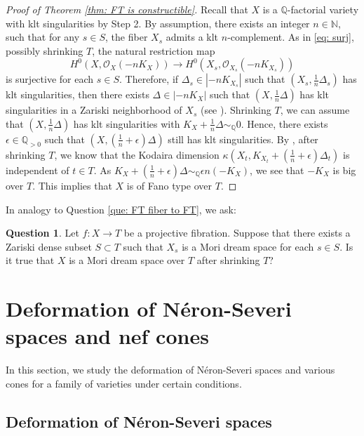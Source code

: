 \documentclass[11pt,oneside,reqno]{amsart}
\numberwithin{equation}{section}
\theoremstyle{definition}
\newtheorem{question}[proposition]{Question}
\newcommand{\bN}{\mathbb{N}}
\newcommand{\bQ}{\mathbb{Q}}
\newcommand{\mO}{\mathcal{O}}
\begin{document}
\begin{proof}[Proof of Theorem \ref{thm: FT is constructible}]
Recall that $X$ is a $\bQ$-factorial variety with klt singularities by Step 2. By assumption, there exists an integer $n\in \bN$, such that for any $s\in S$, the fiber $X_s$ admits a klt $n$-complement. As in \eqref{eq: surj}, possibly shrinking $T$, the natural restriction map
\[
H^0(X, \mO_{X}(-nK_X)) \to H^0(X_s, \mO_{X_s}(-nK_{X_s}))
\] is surjective for each $s\in S$. Therefore, if $\Delta_s\in  |-nK_{X_s}|$ such that $(X_s, \frac 1 n \Delta_s)$ has klt singularities, then there exists $\Delta\in |-nK_X|$ such that $(X, \frac 1 n \Delta)$ has klt singularities in a Zariski neighborhood of $X_s$ (see \cite[Theorem 9.5.19]{Laz04b}). Shrinking $T$, we can assume that $(X, \frac 1 n \Delta)$ has klt singularities with $K_X+\frac 1 n \Delta\sim_\bQ 0$. Hence, there exists $\epsilon \in \bQ_{>0}$ such that $(X, (\frac 1 n +\epsilon)\Delta)$ still has klt singularities. By \cite[Theorem 4.2]{HMX18}, after shrinking $T$, we know that the Kodaira dimension $\kappa(X_t, K_{X_t}+(\frac 1 n +\epsilon)\Delta_t)$ is independent of $t\in T$. As $K_X+(\frac 1 n +\epsilon)\Delta \sim_\bQ \epsilon n(-K_X)$, we see that $-K_X$ is big over $T$. This implies that $X$ is of Fano type over $T$.
\end{proof}

In analogy to Question \ref{que: FT fiber to FT}, we ask:
\begin{question}
Let $f: X \to T$ be a projective fibration. Suppose that there exists a Zariski dense subset $S \subset T$ such that $X_s$ is a Mori dream space for each $s \in S$. Is it true that $X$ is a Mori dream space over $T$ after shrinking $T$?
\end{question}



\section{Deformation of N\'eron-Severi spaces and nef cones}\label{sec: deform cones}

In this section, we study the deformation of N\'eron-Severi spaces and various cones for a family of varieties under certain conditions.

\subsection{Deformation of N\'eron-Severi spaces}\label{subsec: deform NS space}
\end{document}
